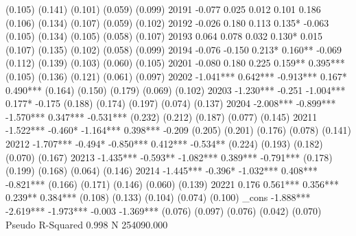 	(0.105)	(0.141)	(0.101)	(0.059)	(0.099)
20191	-0.077	0.025	0.012	0.101	0.186
	(0.106)	(0.134)	(0.107)	(0.059)	(0.102)
20192	-0.026	0.180	0.113	0.135*	-0.063
	(0.105)	(0.134)	(0.105)	(0.058)	(0.107)
20193	0.064	0.078	0.032	0.130*	0.015
	(0.107)	(0.135)	(0.102)	(0.058)	(0.099)
20194	-0.076	-0.150	0.213*	0.160**	-0.069
	(0.112)	(0.139)	(0.103)	(0.060)	(0.105)
20201	-0.080	0.180	0.225	0.159**	0.395***
	(0.105)	(0.136)	(0.121)	(0.061)	(0.097)
20202	-1.041***	0.642***	-0.913***	0.167*	0.490***
	(0.164)	(0.150)	(0.179)	(0.069)	(0.102)
20203	-1.230***	-0.251	-1.004***	0.177*	-0.175
	(0.188)	(0.174)	(0.197)	(0.074)	(0.137)
20204	-2.008***	-0.899***	-1.570***	0.347***	-0.531***
	(0.232)	(0.212)	(0.187)	(0.077)	(0.145)
20211	-1.522***	-0.460*	-1.164***	0.398***	-0.209
	(0.205)	(0.201)	(0.176)	(0.078)	(0.141)
20212	-1.707***	-0.494*	-0.850***	0.412***	-0.534**
	(0.224)	(0.193)	(0.182)	(0.070)	(0.167)
20213	-1.435***	-0.593**	-1.082***	0.389***	-0.791***
	(0.178)	(0.199)	(0.168)	(0.064)	(0.146)
20214	-1.445***	-0.396*	-1.032***	0.408***	-0.821***
	(0.166)	(0.171)	(0.146)	(0.060)	(0.139)
20221	0.176	0.561***	0.356***	0.239**	0.384***
	(0.108)	(0.133)	(0.104)	(0.074)	(0.100)
_cons	-1.888***	-2.619***	-1.973***	-0.003	-1.369***
	(0.076)	(0.097)	(0.076)	(0.042)	(0.070)
Pseudo R-Squared	0.998				
N	254090.000				
